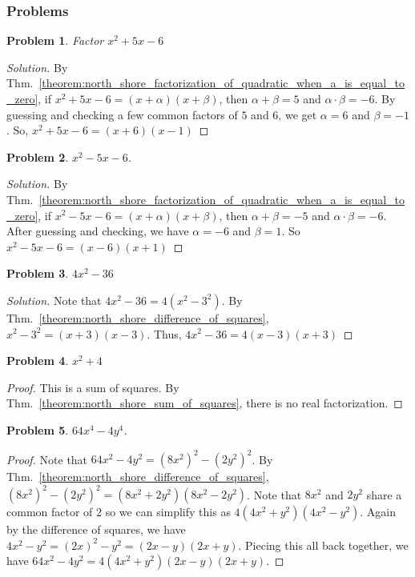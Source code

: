 \documentclass{article}
\theoremstyle{mystyle}
\newtheorem{problem}{Problem}[section]
\begin{document}
\subsubsection{Problems}
\begin{problem}
Factor $x^2 + 5x - 6$
\end{problem}
\begin{proof}[Solution]
By Thm.~\ref{theorem:north_shore_factorization_of_quadratic_when_a_is_equal_to_zero}, if $x^2+5x-6 = (x+\alpha)(x+\beta)$, then $\alpha+\beta = 5$ and $\alpha\cdot \beta = -6$. By guessing and checking a few common factors of $5$ and $6$, we get $\alpha = 6$ and $\beta = -1$. So, $x^2+5x-6 = (x+6)(x-1)$
\end{proof}
\begin{problem}
$x^2 - 5x - 6$.
\end{problem}
\begin{proof}[Solution]
By Thm.~\ref{theorem:north_shore_factorization_of_quadratic_when_a_is_equal_to_zero}, if $x^2-5x-6=(x+\alpha)(x+\beta)$, then $\alpha+\beta = -5$ and $\alpha\cdot \beta = -6$. After guessing and checking, we have $\alpha = -6$ and $\beta = 1$. So $x^2-5x-6 = (x-6)(x+1)$
\end{proof}
\begin{problem}
$4x^2 - 36$
\end{problem}
\begin{proof}[Solution]
Note that $4x^2-36 = 4(x^2-3^2)$. By Thm.~\ref{theorem:north_shore_difference_of_squares}, $x^2-3^2= (x+3)(x-3)$. Thus, $4x^2-36 = 4(x-3)(x+3)$
\end{proof}
\begin{problem}
$x^2 + 4$
\end{problem}
\begin{proof}
This is a sum of squares. By Thm.~\ref{theorem:north_shore_sum_of_squares}, there is no real factorization.
\end{proof}
\begin{problem}
$64x^4 - 4y^4$.
\end{problem}
\begin{proof}
Note that $64x^2 - 4y^2 = (8x^2)^2 - (2y^2)^2$. By Thm.~\ref{theorem:north_shore_difference_of_squares}, $(8x^2)^2 - (2y^2)^2 = (8x^2+2y^2)(8x^2 - 2y^2)$. Note that $8x^2$ and $2y^2$ share a common factor of $2$ so we can simplify this as $ 4(4x^2 +y^2)(4x^2-y^2)$. Again by the difference of squares, we have $4x^2 - y^2 = (2x)^2 - y^2 = (2x-y)(2x+y)$. Piecing this all back together, we have $64x^2 - 4y^2 = 4(4x^2 + y^2)(2x-y)(2x+y)$.
\end{proof}
\end{document}
